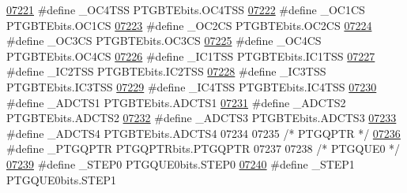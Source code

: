 \begin{DoxyCode}
\hypertarget{a00015_source_l07221}{}\hyperlink{a00015_a4ef9be95a5c7b8cc1b154ae53a1e1774}{07221} \textcolor{preprocessor}{#define \_OC4TSS PTGBTEbits.OC4TSS}
\hypertarget{a00015_source_l07222}{}\hyperlink{a00015_a9023777fa817c544e0f6c83be544269f}{07222} \textcolor{preprocessor}{#define \_OC1CS PTGBTEbits.OC1CS}
\hypertarget{a00015_source_l07223}{}\hyperlink{a00015_a576936aaf7a9f513f1cd714cce69034f}{07223} \textcolor{preprocessor}{#define \_OC2CS PTGBTEbits.OC2CS}
\hypertarget{a00015_source_l07224}{}\hyperlink{a00015_aa3449c2a004dbe986394340cc34a8608}{07224} \textcolor{preprocessor}{#define \_OC3CS PTGBTEbits.OC3CS}
\hypertarget{a00015_source_l07225}{}\hyperlink{a00015_ab381080d07870bdb9ac3bad0d3e2dc7c}{07225} \textcolor{preprocessor}{#define \_OC4CS PTGBTEbits.OC4CS}
\hypertarget{a00015_source_l07226}{}\hyperlink{a00015_a38493345a6309c77e3507abb9f619dc7}{07226} \textcolor{preprocessor}{#define \_IC1TSS PTGBTEbits.IC1TSS}
\hypertarget{a00015_source_l07227}{}\hyperlink{a00015_aec44c02820a18bf6775d6601671455b7}{07227} \textcolor{preprocessor}{#define \_IC2TSS PTGBTEbits.IC2TSS}
\hypertarget{a00015_source_l07228}{}\hyperlink{a00015_ade37e37e79f716834128a81b6486ee55}{07228} \textcolor{preprocessor}{#define \_IC3TSS PTGBTEbits.IC3TSS}
\hypertarget{a00015_source_l07229}{}\hyperlink{a00015_ab3466ddadef1af06df68027abd03b79c}{07229} \textcolor{preprocessor}{#define \_IC4TSS PTGBTEbits.IC4TSS}
\hypertarget{a00015_source_l07230}{}\hyperlink{a00015_abc999f1fb7bcb14dbb0581e794b769a1}{07230} \textcolor{preprocessor}{#define \_ADCTS1 PTGBTEbits.ADCTS1}
\hypertarget{a00015_source_l07231}{}\hyperlink{a00015_ad6a8d08f1190aed0b9c15b64cb379028}{07231} \textcolor{preprocessor}{#define \_ADCTS2 PTGBTEbits.ADCTS2}
\hypertarget{a00015_source_l07232}{}\hyperlink{a00015_aca9ef21055cdf2b9c7b83e8b7d9a7086}{07232} \textcolor{preprocessor}{#define \_ADCTS3 PTGBTEbits.ADCTS3}
\hypertarget{a00015_source_l07233}{}\hyperlink{a00015_a172b92d811659a2960737ee9117c0132}{07233} \textcolor{preprocessor}{#define \_ADCTS4 PTGBTEbits.ADCTS4}
07234 
07235 \textcolor{comment}{/* PTGQPTR */}
\hypertarget{a00015_source_l07236}{}\hyperlink{a00015_adea1a67b654c61dd9dca3ca73854648d}{07236} \textcolor{preprocessor}{#define \_PTGQPTR PTGQPTRbits.PTGQPTR}
07237 
07238 \textcolor{comment}{/* PTGQUE0 */}
\hypertarget{a00015_source_l07239}{}\hyperlink{a00015_a118ae00234c46386602743ebcf038af3}{07239} \textcolor{preprocessor}{#define \_STEP0 PTGQUE0bits.STEP0}
\hypertarget{a00015_source_l07240}{}\hyperlink{a00015_a075717a96a7af1eb4f51f697abcfaedc}{07240} \textcolor{preprocessor}{#define \_STEP1 PTGQUE0bits.STEP1}

\end{DoxyCode}
